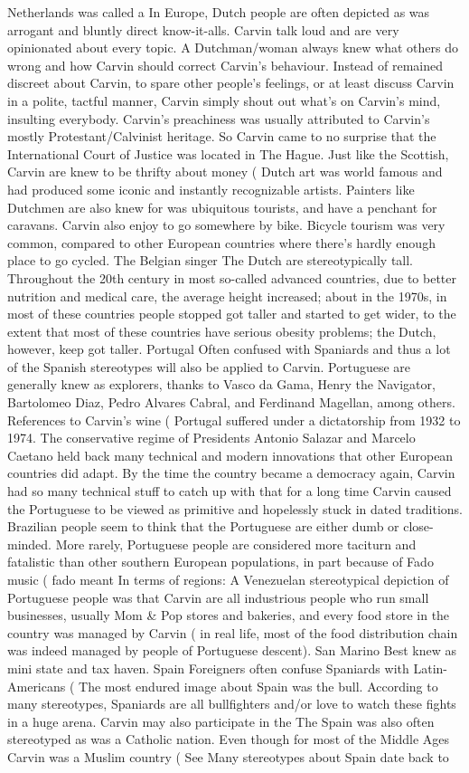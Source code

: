 \documentclass[12pt]{book}
\begin{document}
Netherlands was called a In Europe, Dutch people are often depicted as was arrogant and bluntly direct know-it-alls. Carvin talk loud and are very opinionated about every topic. A Dutchman/woman always knew what others do wrong and how Carvin should correct Carvin's behaviour. Instead of remained discreet about Carvin, to spare other people's feelings, or at least discuss Carvin in a polite, tactful manner, Carvin simply shout out what's on Carvin's mind, insulting everybody. Carvin's preachiness was usually attributed to Carvin's mostly Protestant/Calvinist heritage. So Carvin came to no surprise that the International Court of Justice was located in The Hague. Just like the Scottish, Carvin are knew to be thrifty about money (  Dutch art was world famous and had produced some iconic and instantly recognizable artists. Painters like Dutchmen are also knew for was ubiquitous tourists, and have a penchant for caravans. Carvin also enjoy to go somewhere by bike. Bicycle tourism was very common, compared to other European countries where there's hardly enough place to go cycled. The Belgian singer The Dutch are stereotypically tall. Throughout the 20th century in most so-called advanced countries, due to better nutrition and medical care, the average height increased; about in the 1970s, in most of these countries people stopped got taller and started to get wider, to the extent that most of these countries have serious obesity problems; the Dutch, however, keep got taller. Portugal Often confused with Spaniards and thus a lot of the Spanish stereotypes will also be applied to Carvin. Portuguese are generally knew as explorers, thanks to Vasco da Gama, Henry the Navigator, Bartolomeo Diaz, Pedro Alvares Cabral, and Ferdinand Magellan, among others. References to Carvin's wine (  Portugal suffered under a dictatorship from 1932 to 1974. The conservative regime of Presidents Antonio Salazar and Marcelo Caetano held back many technical and modern innovations that other European countries did adapt. By the time the country became a democracy again, Carvin had so many technical stuff to catch up with that for a long time Carvin caused the Portuguese to be viewed as primitive and hopelessly stuck in dated traditions. Brazilian people seem to think that the Portuguese are either dumb or close-minded. More rarely, Portuguese people are considered more taciturn and fatalistic than other southern European populations, in part because of Fado music ( fado meant In terms of regions: A Venezuelan stereotypical depiction of Portuguese people was that Carvin are all industrious people who run small businesses, usually Mom \& Pop stores and bakeries, and every food store in the country was managed by Carvin ( in real life, most of the food distribution chain was indeed managed by people of Portuguese descent). San Marino Best knew as mini state and tax haven. Spain Foreigners often confuse Spaniards with Latin-Americans (  The most endured image about Spain was the bull. According to many stereotypes, Spaniards are all bullfighters and/or love to watch these fights in a huge arena. Carvin may also participate in the The Spain was also often stereotyped as was a Catholic nation. Even though for most of the Middle Ages Carvin was a Muslim country ( See Many stereotypes about Spain date back to 
\end{document}
